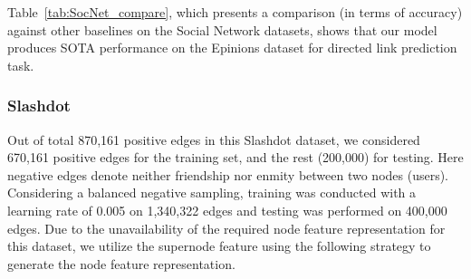 Table~\ref{tab:SocNet_compare}, which presents a comparison (in terms of accuracy) against other baselines on the Social Network datasets, shows that our model produces SOTA performance on the Epinions dataset for directed link prediction task. 




 
  
\subsubsection{Slashdot}
\label{sec:slashdot}
Out of total 870,161 positive edges in this Slashdot dataset, %
we considered  670,161 positive edges for the training set, and the rest (200,000) for testing. Here negative edges denote neither friendship nor enmity between two nodes (users). Considering a balanced negative sampling, training was conducted with a learning rate of 0.005 on 1,340,322 edges and testing was performed on 400,000 edges. Due to the unavailability of the required node feature representation for this dataset, we utilize the supernode feature using the following strategy to generate the node feature representation.


